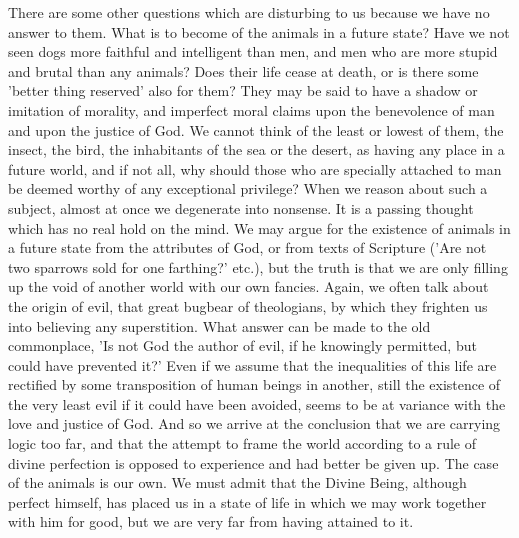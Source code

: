 There are some other questions which are disturbing to us because we have
no answer to them. What is to become of the animals in a future state?
Have we not seen dogs more faithful and intelligent than men, and men who
are more stupid and brutal than any animals? Does their life cease at
death, or is there some 'better thing reserved' also for them? They may be
said to have a shadow or imitation of morality, and imperfect moral claims
upon the benevolence of man and upon the justice of God. We cannot think
of the least or lowest of them, the insect, the bird, the inhabitants of
the sea or the desert, as having any place in a future world, and if not
all, why should those who are specially attached to man be deemed worthy
of any exceptional privilege? When we reason about such a subject, almost
at once we degenerate into nonsense. It is a passing thought which has no
real hold on the mind. We may argue for the existence of animals in a
future state from the attributes of God, or from texts of Scripture ('Are
not two sparrows sold for one farthing?' etc.), but the truth is that we
are only filling up the void of another world with our own fancies. Again,
we often talk about the origin of evil, that great bugbear of theologians,
by which they frighten us into believing any superstition. What answer can
be made to the old commonplace, 'Is not God the author of evil, if he
knowingly permitted, but could have prevented it?' Even if we assume that
the inequalities of this life are rectified by some transposition of human
beings in another, still the existence of the very least evil if it could
have been avoided, seems to be at variance with the love and justice of
God. And so we arrive at the conclusion that we are carrying logic too
far, and that the attempt to frame the world according to a rule of divine
perfection is opposed to experience and had better be given up. The case
of the animals is our own. We must admit that the Divine Being, although
perfect himself, has placed us in a state of life in which we may work
together with him for good, but we are very far from having attained to
it.

